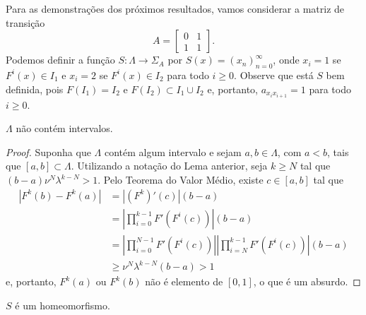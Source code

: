 Para as demonstrações dos próximos resultados, vamos considerar a matriz de transição
$$A = \begin{bmatrix}
0 & 1 \\
1 & 1
\end{bmatrix}.$$
Podemos definir a função $S: \Lambda \to \Sigma_A$ por $S(x) = (x_n)_{n=0}^\infty$, onde $x_i = 1$ se $F^i(x) \in I_1$ e $x_i = 2$ se $F^i(x) \in I_2$ para todo $i \geq 0$. Observe que está $S$ bem definida, pois $F(I_1) = I_2$ e $F(I_2) \subset I_1 \cup I_2$ e, portanto, $a_{x_i x_{i+1}} = 1$ para todo $i \geq 0$. 

\begin{lemma}
$\Lambda$ não contém intervalos.
\end{lemma}

\begin{proof}
Suponha que $\Lambda$ contém algum intervalo e sejam $a, b \in \Lambda$, com $a < b$, tais que $[a, b] \subset \Lambda$. Utilizando a notação do Lema anterior, seja $k \geq N$ tal que $(b - a) \nu^N \lambda^{k - N} > 1$. Pelo Teorema do Valor Médio, existe $c \in [a, b]$ tal que
\begin{align*}
|F^k(b) - F^k(a)| & = |(F^k)'(c)|(b-a) \\
& = \left| \prod_{i=0}^{k-1} F'(F^i(c)) \right| (b-a) \\ 
& = \left| \prod_{i=0}^{N-1} F'(F^i(c)) \right| \left| \prod_{i=N}^{k-1} F'(F^i(c)) \right| (b-a) \\
& \geq \nu^N \lambda^{k-N} (b-a) > 1
\end{align*}
e, portanto, $F^k(a)$ ou $F^k(b)$ não é elemento de $[0,1]$, o que é um absurdo.
\end{proof}

\begin{proposition}
$S$ é um homeomorfismo.
\end{proposition}



